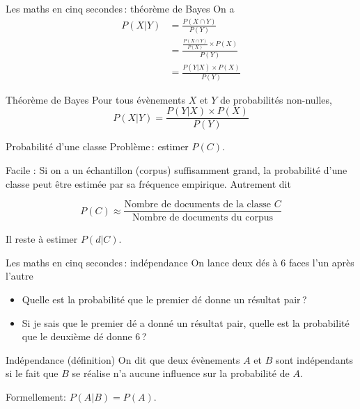 \documentclass[../allslides.tex]{subfiles}
\begin{document}
\begin{frame}{Les maths en cinq secondes : théorème de Bayes}
	On a
	\begin{align}
		P(X|Y)
			&= \frac{P(X∩Y)}{P(Y)}\\
			&= \frac{\frac{P(X∩Y)}{P(X)}×P(X)}{P(Y)}\\
			&= \frac{P(Y|X)×P(X)}{P(Y)}
	\end{align}
	\pause
	\begin{block}{Théorème de Bayes}
		Pour tous évènements \(X\) et \(Y\) de probabilités non-nulles,
		\begin{equation}
			P(X|Y)=\frac{P(Y|X)×P(X)}{P(Y)}
		\end{equation}
	\end{block}
\end{frame}


\begin{frame}{Probabilité d'une classe}
	Problème : estimer \(P(C)\).

	\pause
	Facile : Si on a un échantillon (corpus) suffisamment grand, la probabilité d'une classe peut être estimée par sa fréquence empirique. Autrement dit

	\pause

	\begin{equation}
		P(C) ≈ \frac{\text{Nombre de documents de la classe \(C\)}}{\text{Nombre de documents du corpus}}
	\end{equation}

	\pause
	Il reste à estimer \(P(d|C)\).
\end{frame}

\begin{frame}{Les maths en cinq secondes : indépendance}
	On lance deux dés à \num{6} faces l'un après l'autre

	\begin{itemize}
		\item<+-> Quelle est la probabilité que le premier dé donne un résultat pair ?
		\item<+-> Si je sais que le premier dé a donné un résultat pair, quelle est la probabilité que le deuxième dé donne \num{6} ?
	\end{itemize}
	\itpause

	\begin{block}{Indépendance (définition)}
		On dit que deux évènements \(A\) et \(B\) sont indépendants si le fait que \(B\) se réalise n'a aucune influence sur la probabilité de \(A\).

		Formellement: \(P(A|B)=P(A)\).
	\end{block}
\end{frame}
\end{document}
